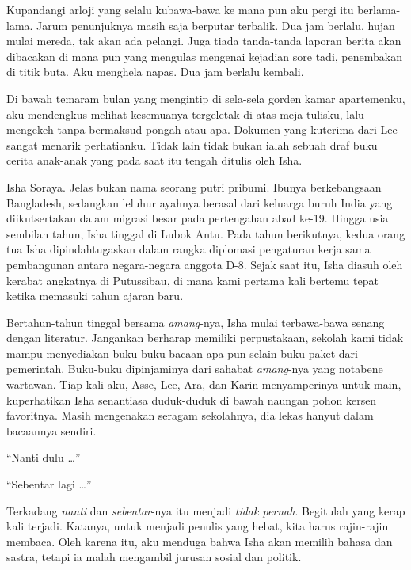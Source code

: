 \documentclass[smalldemyvopaper,11pt,twoside,onecolumn,openright,extrafontsizes]{memoir}
\begin{document}

Kupandangi arloji yang selalu kubawa-bawa ke mana pun aku pergi itu berlama-lama. Jarum penunjuknya masih saja berputar terbalik. Dua jam berlalu, hujan mulai mereda, tak akan ada pelangi. Juga tiada tanda-tanda laporan berita akan dibacakan di mana pun yang mengulas mengenai kejadian sore tadi, penembakan di titik buta. Aku menghela napas. Dua jam berlalu kembali.


Di bawah temaram bulan yang mengintip di sela-sela gorden kamar apartemenku, aku mendengkus melihat kesemuanya tergeletak di atas meja tulisku, lalu mengekeh tanpa bermaksud pongah atau apa. Dokumen yang kuterima dari Lee sangat menarik perhatianku. Tidak lain tidak bukan ialah sebuah draf buku cerita anak-anak yang pada saat itu tengah ditulis oleh Isha.

Isha Soraya. Jelas bukan nama seorang putri pribumi. Ibunya berkebangsaan Bangladesh, sedangkan leluhur ayahnya berasal dari keluarga buruh India yang diikutsertakan dalam migrasi besar pada pertengahan abad ke-19. Hingga usia sembilan tahun, Isha tinggal di Lubok Antu. Pada tahun berikutnya, kedua orang tua Isha dipindahtugaskan dalam rangka diplomasi pengaturan kerja sama pembangunan antara negara-negara anggota D-8. Sejak saat itu, Isha diasuh oleh kerabat angkatnya di Putussibau, di mana kami pertama kali bertemu tepat ketika memasuki tahun ajaran baru.



Bertahun-tahun tinggal bersama \textit{amang}-nya, Isha mulai terbawa-bawa senang dengan literatur. Jangankan berharap memiliki perpustakaan, sekolah kami tidak mampu menyediakan buku-buku bacaan apa pun selain buku paket dari pemerintah. Buku-buku dipinjaminya dari sahabat \textit{amang}-nya yang notabene wartawan. Tiap kali aku, Asse, Lee, Ara, dan Karin menyamperinya untuk main, kuperhatikan Isha senantiasa duduk-duduk di bawah naungan pohon kersen favoritnya. Masih mengenakan seragam sekolahnya, dia lekas hanyut dalam bacaannya sendiri.

``Nanti dulu \dots''

``Sebentar lagi \dots''

Terkadang \textit{nanti} dan \textit{sebentar}-nya itu menjadi \textit{tidak pernah}. Begitulah yang kerap kali terjadi. Katanya, untuk menjadi penulis yang hebat, kita harus rajin-rajin membaca. Oleh karena itu, aku menduga bahwa Isha akan memilih bahasa dan sastra, tetapi ia malah mengambil jurusan sosial dan politik.
\end{document}
